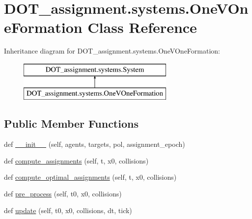 \hypertarget{class_d_o_t__assignment_1_1systems_1_1_one_v_one_formation}{}\section{D\+O\+T\+\_\+assignment.\+systems.\+One\+V\+One\+Formation Class Reference}
\label{class_d_o_t__assignment_1_1systems_1_1_one_v_one_formation}
Inheritance diagram for D\+O\+T\+\_\+assignment.\+systems.\+One\+V\+One\+Formation\+:\begin{figure}[H]
\begin{center}
\leavevmode
\includegraphics[height=2.000000cm]{class_d_o_t__assignment_1_1systems_1_1_one_v_one_formation}
\end{center}
\end{figure}
\subsection*{Public Member Functions}
\begin{DoxyCompactItemize}
\item 
def \mbox{\hyperlink{class_d_o_t__assignment_1_1systems_1_1_one_v_one_formation_add4134e8f088317b97110a33ab132e00}{\+\_\+\+\_\+init\+\_\+\+\_\+}} (self, agents, targets, pol, assignment\+\_\+epoch)
\item 
def \mbox{\hyperlink{class_d_o_t__assignment_1_1systems_1_1_one_v_one_formation_a296aed699e0baaa350ffd516b6f1d9c5}{compute\+\_\+assignments}} (self, t, x0, collisions)
\item 
def \mbox{\hyperlink{class_d_o_t__assignment_1_1systems_1_1_one_v_one_formation_a21bf23aedfd8d209675e89a88c99232d}{compute\+\_\+optimal\+\_\+assignments}} (self, t, x0, collisions)
\item 
def \mbox{\hyperlink{class_d_o_t__assignment_1_1systems_1_1_one_v_one_formation_a542849b0731610d73b57d81175b25a87}{pre\+\_\+process}} (self, t0, x0, collisions)
\item 
def \mbox{\hyperlink{class_d_o_t__assignment_1_1systems_1_1_one_v_one_formation_a788744bbae34f3f53226e4cfb5c321cf}{update}} (self, t0, x0, collisions, dt, tick)
\end{DoxyCompactItemize}
